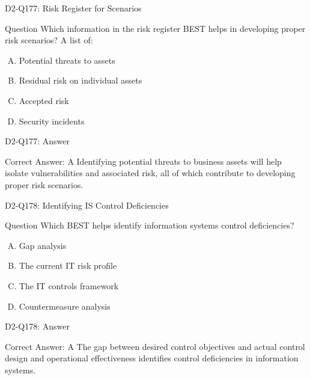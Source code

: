 \documentclass{beamer}
\begin{document}
	\begin{frame}{D2-Q177: Risk Register for Scenarios}
		\begin{block}{Question}
			Which information in the risk register BEST helps in developing proper risk scenarios? A list of:
		\end{block}
		\begin{enumerate}[(A)]
			\item Potential threats to assets
			\item Residual risk on individual assets
			\item Accepted risk
			\item Security incidents
		\end{enumerate}
	\end{frame}
	\begin{frame}{D2-Q177: Answer}
		\begin{block}{Correct Answer: A}
			Identifying potential threats to business assets will help isolate vulnerabilities and associated risk, all of which contribute to developing proper risk scenarios.
		\end{block}
	\end{frame}
	
	\begin{frame}{D2-Q178: Identifying IS Control Deficiencies}
		\begin{block}{Question}
			Which BEST helps identify information systems control deficiencies?
		\end{block}
		\begin{enumerate}[(A)]
			\item Gap analysis
			\item The current IT risk profile
			\item The IT controls framework
			\item Countermeasure analysis
		\end{enumerate}
	\end{frame}
	\begin{frame}{D2-Q178: Answer}
		\begin{block}{Correct Answer: A}
			The gap between desired control objectives and actual control design and operational effectiveness identifies control deficiencies in information systems.
		\end{block}
	\end{frame}
	
\end{document}
